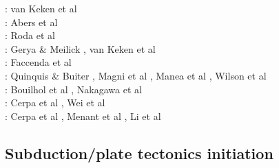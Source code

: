 \begin{scriptsize}
\twothousandtwo: van Keken et al \cite{vakp02}\\
\twothousandsix: Abers et al \cite{abvk06}\\
\twothousandten: Roda et al \cite{roms10}\\
\twothousandeleven: Gerya \& Meilick \cite{geme11}, van Keken et al \cite{vahs11}\\
\twothousandtwelve: Faccenda et al \cite{fagm12}\\
\twothousandfourteen: Quinquis \& Buiter \cite{qubu14}, Magni et al \cite{mabv14}, Manea et al \cite{malg14}, 
Wilson et al \cite{wisv14}\\
\twothousandfifteen: Bouilhol et al \cite{bomv15}, Nakagawa et al \cite{nani15}\\
\twothousandseventeen: Cerpa et al \cite{ceww17}, Wei et al \cite{wewv17}\\
\twothousandnineteen: Cerpa et al \cite{ceww19}, Menant et al \cite{meag19}, Li et al \cite{ligc19}
\end{scriptsize}


\subsection{Subduction/plate tectonics initiation}

